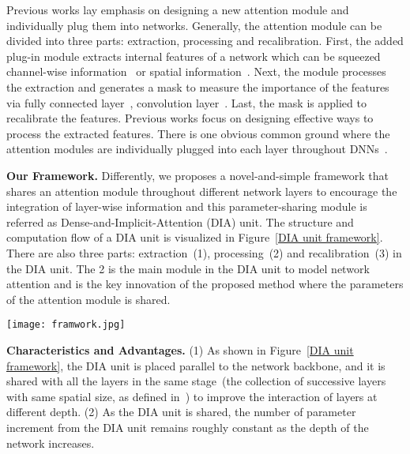 \documentclass[letterpaper]{article} \usepackage{aaai20}  \usepackage{times}  \usepackage{helvet} \usepackage{courier}  \usepackage[hyphens]{url}  \usepackage{graphicx} \urlstyle{rm} \def\UrlFont{\rm}  \usepackage{graphicx}  \frenchspacing  \setlength{\pdfpagewidth}{8.5in}  \setlength{\pdfpageheight}{11in}  \usepackage{color}
\begin{document}
	Previous works lay emphasis on designing a new attention module and individually plug them into networks. Generally, the attention module can be divided into three parts: extraction, processing and recalibration. First, the added plug-in module extracts internal features of a network which can be squeezed channel-wise information~\cite{hu2018squeeze,li2019selective} or spatial information~\cite{wang2018non,woo2018cbam,park2018bam}. Next, the module processes the extraction and generates a mask to measure the importance of the features via fully connected layer~\cite{hu2018squeeze}, convolution layer~\cite{wang2018non}. Last, the mask is applied to recalibrate the features. Previous works focus on designing effective ways to process the extracted features. There is one obvious common ground where the attention modules are individually plugged into each layer throughout DNNs~\cite{hu2018squeeze,woo2018cbam,park2018bam,wang2018non}.
	
\textbf{Our Framework.} Differently, we proposes a novel-and-simple framework that shares an attention module throughout different network layers to encourage the integration of layer-wise information and this parameter-sharing module is referred as Dense-and-Implicit-Attention (DIA) unit. The structure and computation flow of a DIA unit is visualized in Figure~\ref{DIA unit framework}. There are also three parts: extraction~({\small{\textcircled{\tiny{1}}}}), processing~({\small{\textcircled{\tiny{2}}}}) and recalibration~({\small{\textcircled{\tiny{3}}}}) in the DIA unit. The {\small{\textcircled{\tiny{2}}}} is the main module in the DIA unit to model network attention and is the key innovation of the proposed method where the parameters of the attention module is shared. 
\begin{figure*}[h]
		\centering
		\texttt{[image: framwork.jpg]}
		\caption{DIA units.  means the operation for extracting different scales of features.  means the operation for emphasizing features.}
		\label{DIA unit framework}
	\end{figure*}
\textbf{Characteristics and Advantages.} (1) As shown in Figure~\ref{DIA unit framework}, the DIA unit is placed parallel to the network backbone, and it is shared with all the layers in the same stage~(the collection of successive layers with same spatial size, as defined in~\cite{he2016deep}) to improve the interaction of layers at different depth. (2) As the DIA unit is shared, the number of parameter increment from the DIA unit remains roughly constant as the depth of the network increases.
\end{document}
